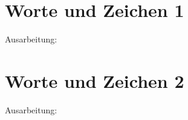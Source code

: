 \documentclass[a4paper,11pt,titlepage]{article}
\begin{document}
\section{Worte und Zeichen 1}
Ausarbeitung:
\newpage
\section{Worte und Zeichen 2}
Ausarbeitung:
\newpage
\end{document}
